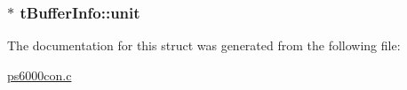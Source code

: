 \subsubsection[{\texorpdfstring{unit}{unit}}]{$\ast$ t\+Buffer\+Info\+::unit}\hypertarget{structtBufferInfo_a306319efa78abf4711eb3f8cb7370103}{}\label{structtBufferInfo_a306319efa78abf4711eb3f8cb7370103}


The documentation for this struct was generated from the following file\+:\begin{DoxyCompactItemize}
\item 
\hyperlink{ps6000con_8c}{ps6000con.\+c}\end{DoxyCompactItemize}
